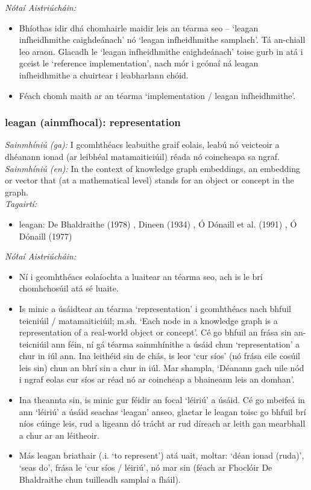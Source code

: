 \documentclass{article}
\begin{document}
 \noindent \textit{Nótaí Aistriúcháin:}
\begin{itemize}
	\item Bhíothas idir dhá chomhairle maidir leis an téarma seo -- `leagan infheidhmithe caighdeánach' nó `leagan infheidhmithe samplach'. Tá an-chiall leo araon. Glacadh le `leagan infheidhmithe caighdeánach' toisc gurb in atá i gceist le `reference implementation', nach mór i gcónaí ná leagan infheidhmithe a chuirtear i leabharlann chóid.
	\item Féach chomh maith ar an téarma `implementation / leagan infheidhmithe'.
\end{itemize}


\subsubsection*{leagan (ainmfhocal): representation}
 \noindent \textit{Sainmhíniú (ga):} I gcomhthéacs leabuithe graif eolais, leabú nó veicteoir a dhéanann ionad (ar leibhéal matamaiticiúil) réada nó coincheapa sa ngraf.
\\
 \noindent \textit{Sainmhíniú (en):} In the context of knowledge graph embeddings, an embedding or vector that (at a mathematical level) stands for an object or concept in the graph.
\\
 \noindent \textit{Tagairtí:}
\begin{itemize}
	\item leagan: De Bhaldraithe (1978) \cite{de-bhaldraithe}, Dineen (1934) \cite{dineen}, Ó Dónaill et al. (1991) \cite{focloir-beag}, Ó Dónaill (1977) \cite{odonaill}
\end{itemize}

 \noindent \textit{Nótaí Aistriúcháin:}
\begin{itemize}
	\item Ní i gcomhthéacs eolaíochta a luaitear an téarma seo, ach is le brí chomhchosúil atá sé luaite.
	\item Is minic a úsáidtear an téarma `representation' i gcomhthéacs nach bhfuil teicniúil / matamaiticiúil; m.sh. `Each node in a knowledge graph is a representation of a real-world object or concept'. Cé go bhfuil an frása sin an-teicniúil ann féin, ní gá téarma sainmhínithe a úsáid chun `representation' a chur in iúl ann. Ina leithéid sin de chás, is leor `cur síos' (nó frása eile cosúil leis sin) chun an bhrí sin a chur in iúl. Mar shampla, `Déanann gach uile nód i ngraf eolas cur síos ar réad nó ar coincheap a bhaineann leis an domhan'.
	\item Ina theannta sin, is minic gur féidir an focal `léiriú' a úsáid. Cé go mbeifeá in ann `léiriú' a úsáid seachas `leagan' anseo, glactar le leagan toisc go bhfuil brí níos cúinge leis, rud a ligeann dó trácht ar rud díreach ar leith gan mearbhall a chur ar an léitheoir.
	\item Más leagan briathair (.i. `to represent') atá uait, moltar: `déan ionad (ruda)', `seas do', frása le `cur síos / léiriú', nó mar sin (féach ar Fhoclóir De Bhaldraithe chun tuilleadh samplaí a fháil).
\end{itemize}
\end{document}

